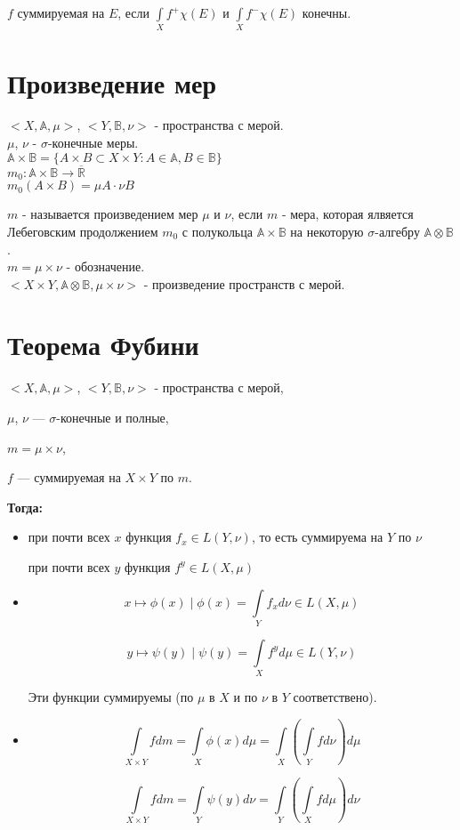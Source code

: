 \documentclass[paper=a4, fontsize=17pt]{article}
\begin{document}
	$f$ суммируемая на $E$, если $\int\limits_{X}f^+ \chi(E)$ и $\int\limits_{X}f^- \chi(E)$ конечны.

	\section{Произведение мер}
	$<X, \mathds{A}, \mu>$, $<Y, \mathds{B}, \nu>$ - пространства с мерой.\\
	$\mu$, $\nu$ - $\sigma$-конечные меры.\\
	$\mathds{A} \times \mathds{B} = \{A\times B \subset X \times Y : A \in \mathds{A}, B \in \mathds{B} \}$ \\
	$m_0 : \mathds{A} \times \mathds{B} \rightarrow \overline{\mathds{R}}$\\ $m_0(A \times B) = \mu A \cdot \nu B$

	$m$ - называется произведением мер $\mu$ и $\nu$, если $m$ - мера, которая ялвяется Лебеговским продолжением $m_0$ с полукольца $\mathds{A} \times \mathds{B}$ на некоторую $\sigma$-алгебру $\mathds{A} \otimes \mathds{B}$.\\
	$m = \mu \times \nu$ - обозначение. \\
	$<X \times Y, \mathds{A} \otimes \mathds{B}, \mu \times \nu>$ - произведение пространств с мерой.

	\section{Теорема Фубини}
	$<X, \mathds{A}, \mu>$, $<Y, \mathds{B}, \nu>$ - пространства с мерой,

	$\mu$, $\nu$ --- $\sigma$-конечные и полные,

	$m = \mu \times \nu$,

	$f$ --- суммируемая на $X \times Y$ по $m$.

	\textbf{Тогда:}
	\begin{itemize}
		\item
		при почти всех $x$ функция $f_x \in L(Y,\nu)$, то есть суммируема на $Y$ по $\nu$

		при почти всех $y$ функция $f^y \in L(X,\mu)$

		\item
		$$x \mapsto \phi(x) \mid \phi(x) = \int\limits_{Y}f_x d\nu \in L(X,\mu)$$

		$$y \mapsto \psi(y) \mid \psi(y) = \int\limits_{X}f^y d\mu \in L(Y,\nu)$$

		Эти функции суммируемы (по $\mu$ в $X$ и по $\nu$ в $Y$ соответствено).

		\item
		$$\int\limits_{X \times Y} f dm
		= \int\limits_{X}\phi(x) d\mu
		= \int\limits_{X} (\int\limits_{Y} f d\nu) d\mu$$

		$$\int\limits_{X \times Y} f dm
		= \int\limits_{Y}\psi(y) d\nu
		= \int\limits_{Y} (\int\limits_{X} f d\mu) d\nu$$
	\end{itemize}
\end{document}
